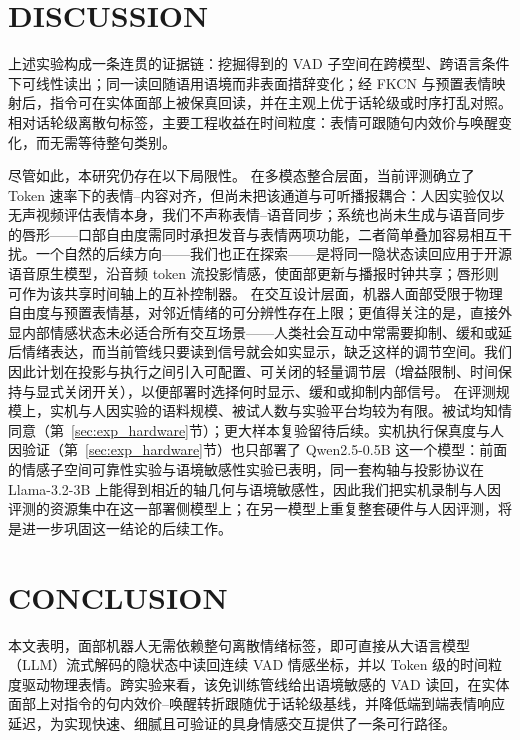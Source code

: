 \documentclass[letterpaper, 10 pt, conference]{ieeeconf/ieeeconf}
\begin{document}
\section{DISCUSSION}
\label{sec:discussion}

上述实验构成一条连贯的证据链：挖掘得到的 VAD 子空间在跨模型、跨语言条件下可线性读出；同一读回随语用语境而非表面措辞变化；经 FKCN 与预置表情映射后，指令可在实体面部上被保真回读，并在主观上优于话轮级或时序打乱对照。相对话轮级离散句标签，主要工程收益在时间粒度：表情可跟随句内效价与唤醒变化，而无需等待整句类别。

尽管如此，本研究仍存在以下局限性。
在多模态整合层面，当前评测确立了 Token 速率下的表情--内容对齐，但尚未把该通道与可听播报耦合：人因实验仅以无声视频评估表情本身，我们不声称表情--语音同步；系统也尚未生成与语音同步的唇形——口部自由度需同时承担发音与表情两项功能，二者简单叠加容易相互干扰。一个自然的后续方向——我们也正在探索——是将同一隐状态读回应用于开源语音原生模型，沿音频 token 流投影情感，使面部更新与播报时钟共享；唇形则可作为该共享时间轴上的互补控制器。
在交互设计层面，机器人面部受限于物理自由度与预置表情基，对邻近情绪的可分辨性存在上限；更值得关注的是，直接外显内部情感状态未必适合所有交互场景——人类社会互动中常需要抑制、缓和或延后情绪表达，而当前管线只要读到信号就会如实显示，缺乏这样的调节空间。我们因此计划在投影与执行之间引入可配置、可关闭的轻量调节层（增益限制、时间保持与显式关闭开关），以便部署时选择何时显示、缓和或抑制内部信号。
在评测规模上，实机与人因实验的语料规模、被试人数与实验平台均较为有限。被试均知情同意（第~\ref{sec:exp_hardware}节）；更大样本复验留待后续。实机执行保真度与人因验证（第~\ref{sec:exp_hardware}节）也只部署了 Qwen2.5-0.5B 这一个模型：前面的情感子空间可靠性实验与语境敏感性实验已表明，同一套构轴与投影协议在 Llama-3.2-3B 上能得到相近的轴几何与语境敏感性，因此我们把实机录制与人因评测的资源集中在这一部署侧模型上；在另一模型上重复整套硬件与人因评测，将是进一步巩固这一结论的后续工作。

\section{CONCLUSION}
\label{sec:conclusion}

本文表明，面部机器人无需依赖整句离散情绪标签，即可直接从大语言模型（LLM）流式解码的隐状态中读回连续 VAD 情感坐标，并以 Token 级的时间粒度驱动物理表情。跨实验来看，该免训练管线给出语境敏感的 VAD 读回，在实体面部上对指令的句内效价--唤醒转折跟随优于话轮级基线，并降低端到端表情响应延迟，为实现快速、细腻且可验证的具身情感交互提供了一条可行路径。



\end{document}
